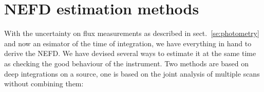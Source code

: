 

\section{NEFD estimation methods}
\label{se:nefd_estimation_methods}

With the uncertainty on flux measurements as described in sect.~\ref{se:photometry} and
now an esimator of the time of integration, we have everything in hand to derive
the NEFD. We have devised several ways to estimate it at the same time as
checking the good behaviour of the instrument. Two methods are based on deep
integrations on a source, one is based on the joint analysis of multiple scans
without combining them:


